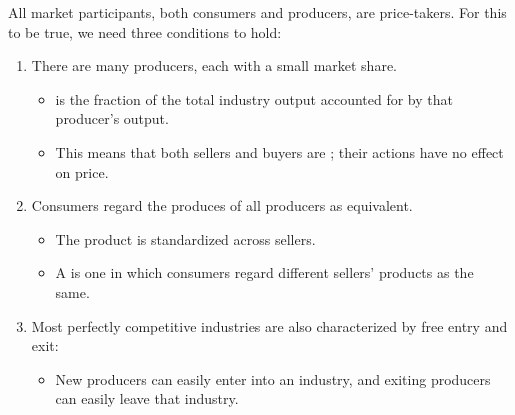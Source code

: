 \documentclass{article}
\begin{document}
All market participants, both consumers and producers, are price-takers. For this to be true, we need three conditions to hold: 
\begin{enumerate}
  \item There are many producers, each with a small market share. 
    \begin{itemize}
      \item {} is the fraction of the total industry output accounted for by that producer's output. 
      \item This means that both sellers and buyers are ; their actions have no effect on price. 
    \end{itemize}
  \item Consumers regard the produces of all producers as equivalent. 
    \begin{itemize}
      \item The product is standardized across sellers. 
      \item A  is one in which consumers regard different sellers' products as the same.
    \end{itemize}
  \item Most perfectly competitive industries are also characterized by free entry and exit: 
  \begin{itemize}
    \item New producers can easily enter into an industry, and exiting producers can easily leave that industry. 
  \end{itemize}
\end{enumerate}
\end{document}
